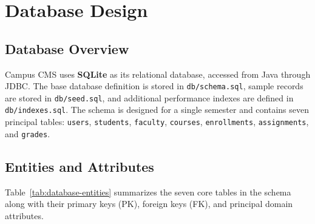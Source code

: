 \section{Database Design}
\label{sec:database}

\subsection{Database Overview}
Campus CMS uses \textbf{SQLite} as its relational database, accessed from Java through JDBC. The base database definition is stored in \texttt{db/schema.sql}, sample records are stored in \texttt{db/seed.sql}, and additional performance indexes are defined in \texttt{db/indexes.sql}. The schema is designed for a single semester and contains seven principal tables: \texttt{users}, \texttt{students}, \texttt{faculty}, \texttt{courses}, \texttt{enrollments}, \texttt{assignments}, and \texttt{grades}.

\subsection{Entities and Attributes}
Table~\ref{tab:database-entities} summarizes the seven core tables in the schema along with their primary keys (PK), foreign keys (FK), and principal domain attributes.

